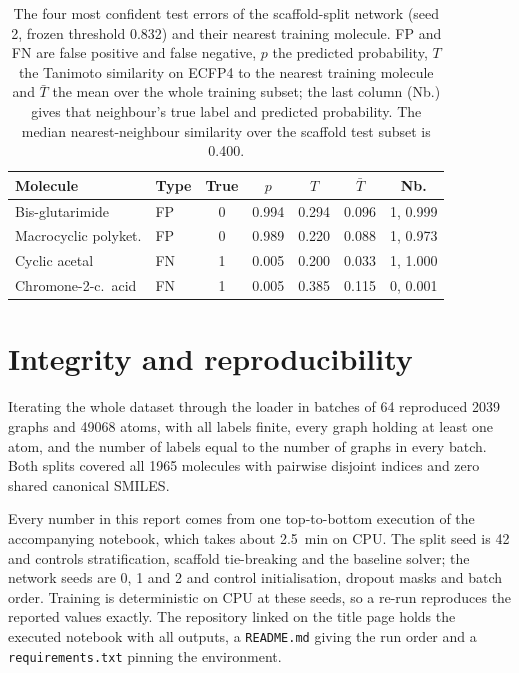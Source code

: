 \begin{table}[htb]
    \centering
    \caption{The four most confident test errors of the scaffold-split network (seed 2, frozen threshold 0.832) and their nearest training molecule. FP and FN are false positive and false negative, $p$ the predicted probability, $T$ the Tanimoto similarity on ECFP4 to the nearest training molecule and $\bar{T}$ the mean over the whole training subset; the last column (Nb.) gives that neighbour's true label and predicted probability. The median nearest-neighbour similarity over the scaffold test subset is 0.400.}
    \label{tab:errors}
    \scriptsize
    \setlength{\tabcolsep}{2.5pt}
    \begin{tabular}{@{}llccccc@{}}
        \toprule
        Molecule & Type & True & $p$ & $T$ & $\bar{T}$ & Nb. \\
        \midrule
        Bis-glutarimide      & FP & 0 & 0.994 & 0.294 & 0.096 & 1, 0.999 \\
        Macrocyclic polyket. & FP & 0 & 0.989 & 0.220 & 0.088 & 1, 0.973 \\
        Cyclic acetal        & FN & 1 & 0.005 & 0.200 & 0.033 & 1, 1.000 \\
        Chromone-2-c.\ acid  & FN & 1 & 0.005 & 0.385 & 0.115 & 0, 0.001 \\
        \bottomrule
    \end{tabular}
\end{table}

\section{Integrity and reproducibility}
\label{sec:integrity}
\label{sec:repro}

Iterating the whole dataset through the loader in batches of 64 reproduced 2039 graphs and \num{49068} atoms, with all labels finite, every graph holding at least one atom, and the number of labels equal to the number of graphs in every batch. Both splits covered all 1965 molecules with pairwise disjoint indices and zero shared canonical SMILES.

Every number in this report comes from one top-to-bottom execution of the accompanying notebook, which takes about \SI{2.5}{\minute} on CPU. The split seed is 42 and controls stratification, scaffold tie-breaking and the baseline solver; the network seeds are 0, 1 and 2 and control initialisation, dropout masks and batch order. Training is deterministic on CPU at these seeds, so a re-run reproduces the reported values exactly. The repository linked on the title page holds the executed notebook with all outputs, a \texttt{README.md} giving the run order and a \texttt{requirements.txt} pinning the environment.
